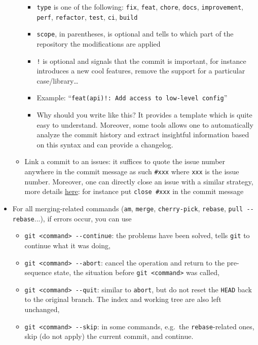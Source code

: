 \documentclass[a4paper,12pt,%
              final%
              ]{article}
\begin{document}
\begin{itemize}
\begin{itemize}
\begin{itemize}
          \item \texttt{type} is one of the following: \texttt{fix}, \texttt{feat}, \texttt{chore}, \texttt{docs}, \texttt{improvement}, \texttt{perf}, \texttt{refactor}, \texttt{test}, \texttt{ci}, \texttt{build}
          \item \texttt{scope}, in parentheses, is optional and tells to which part of the repository the modifications are applied
          \item \texttt{!} is optional and signals that the commit is important, for instance introduces a new cool features, remove the support for a particular case/library\ldots
          \item Example: ``\texttt{feat(api)!: Add access to low-level config}''
          \item Why should you write like this? It provides a template which is quite easy to understand. Moreover, some tools allows one to automatically analyze the commit history and extract insightful information based on this syntax and can provide a changelog.
        \end{itemize}
      \item Link a commit to an issues: it suffices to quote the issue number anywhere in the commit message as such \verb|#xxx| where \texttt{xxx} is the issue number. Moreover, one can directly close an issue with a similar strategy, more details \href{https://docs.github.com/en/issues/tracking-your-work-with-issues/linking-a-pull-request-to-an-issue}{here}: for instance put \verb|close #xxx| in the commit message
    \end{itemize}
  \item For all merging-related commands (\texttt{am}, \texttt{merge}, \texttt{cherry-pick}, \texttt{rebase}, \verb|pull --rebase|...), if errors occur, you can use
    \begin{itemize}
      \item \verb|git <command> --continue|: the problems have been solved, tells \texttt{git} to continue what it was doing,
      \item \verb|git <command> --abort|: cancel the operation and return to the pre-sequence state, the situation before \texttt{git <command>} was called,
      \item \verb|git <command> --quit|: similar to \texttt{abort}, but do not reset the \texttt{HEAD} back to the original branch. The index and working tree are also left unchanged,
      \item \verb|git <command> --skip|: in some commands, e.g.~the \texttt{rebase}-related ones, skip (do not apply) the current commit, and continue.

\end{itemize}
\end{itemize}
\end{document}
